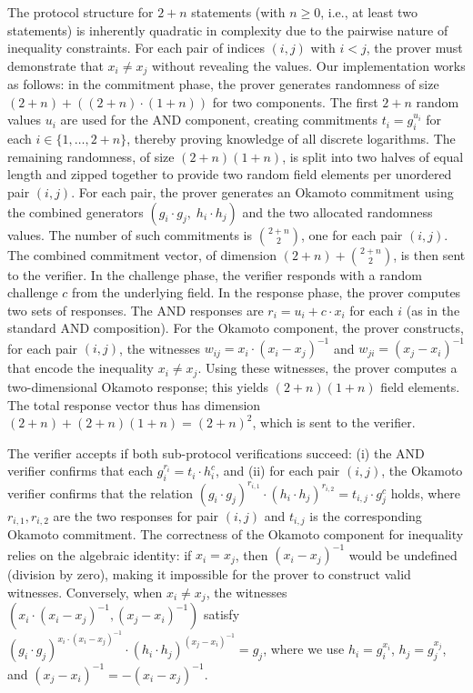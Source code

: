 \documentclass[sigconf, anonymous]{acmart}
\begin{document}
The protocol structure for $2+n$ statements (with $n \ge 0$, i.e., at least two statements) is inherently quadratic in complexity due to the pairwise nature of inequality constraints. For each pair of indices $(i, j)$ with $i < j$, the prover must demonstrate that $x_i \neq x_j$ without revealing the values. Our implementation works as follows: in the commitment phase, the prover generates randomness of size $(2 + n) + ((2 + n) \cdot (1 + n))$ for two components. The first $2+n$ random values $u_i$ are used for the AND component, creating commitments $t_i = g_i^{u_i}$ for each $i \in \{1,\dots,2+n\}$, thereby proving knowledge of all discrete logarithms. The remaining randomness, of size $(2+n)(1+n)$, is split into two halves of equal length and zipped together to provide two random field elements per unordered pair $(i,j)$. For each pair, the prover generates an Okamoto commitment using the combined generators $(g_i \cdot g_j,\; h_i \cdot h_j)$ and the two allocated randomness values. 
The number of such commitments is $\binom{2+n}{2}$, one for each  pair $(i,j)$. The combined commitment vector, of dimension $(2+n) + \binom{2+n}{2}$, is then sent to the verifier. In the challenge phase, the verifier responds with a random challenge $c$ from the underlying field. In the response phase, the prover computes two sets of responses. The AND responses are $r_i = u_i + c \cdot x_i$ for each $i$ (as in the standard AND composition). For the Okamoto component, the prover constructs, for each pair $(i,j)$, the witnesses $w_{ij} = x_i \cdot (x_i - x_j)^{-1}$ and $w_{ji} = (x_j - x_i)^{-1}$ that encode the inequality $x_i \neq x_j$. Using these witnesses, the prover computes a two-dimensional Okamoto response; this yields $(2+n)(1+n)$ field elements. The total response vector thus has dimension $(2+n) + (2+n)(1+n) = (2+n)^2$, which is sent to the verifier.

The verifier accepts if both sub-protocol verifications succeed: (i) the AND verifier confirms that each $g_i^{r_i} = t_i \cdot h_i^c$, and (ii) for each pair $(i, j)$, the Okamoto verifier confirms that the relation $(g_i \cdot g_j)^{r_{i,1}} \cdot (h_i \cdot h_j)^{r_{i,2}} = t_{i,j} \cdot g_j^c$ holds, where $r_{i,1}, r_{i,2}$ are the two responses for pair $(i,j)$ and $t_{i,j}$ is the corresponding Okamoto commitment. The correctness of the Okamoto component for inequality relies on the algebraic identity: if $x_i = x_j$, then $(x_i - x_j)^{-1}$ would be undefined (division by zero), making it impossible for the prover to construct valid witnesses. Conversely, when $x_i \neq x_j$, the witnesses $\left(x_i \cdot (x_i - x_j)^{-1}, (x_j - x_i)^{-1}\right)$ satisfy $(g_i \cdot g_j)^{x_i \cdot (x_i - x_j)^{-1}} \cdot (h_i \cdot h_j)^{(x_j - x_i)^{-1}} = g_j$, where we use $h_i = g_i^{x_i}$, $h_j = g_j^{x_j}$, and $(x_j - x_i)^{-1} = -(x_i - x_j)^{-1}$.
\end{document}
